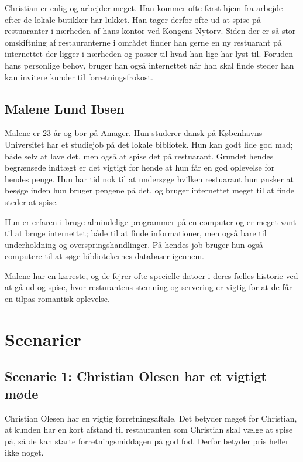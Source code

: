 \documentclass[a4paper, 12pt]{article}
\begin{document}
Christian er enlig og arbejder meget. Han kommer ofte først hjem fra arbejde
efter de lokale butikker har lukket. Han tager derfor ofte ud at spise på
restuaranter i nærheden af hans kontor ved Kongens Nytorv. Siden der er så stor
omskiftning af restauranterne i området finder han gerne en ny restuarant på
internettet der ligger i nærheden og passer til hvad han lige har lyst til.
Foruden hans personlige behov, bruger han også internettet når han skal finde
steder han kan invitere kunder til forretningsfrokost. 

\subsection{Malene Lund Ibsen}
Malene er 23 år og bor på Amager. Hun studerer dansk på Københavns Universitet
har et studiejob på det lokale bibliotek. Hun kan godt lide god mad; både selv
at lave det, men også at spise det på restuarant. Grundet hendes begrænsede
indtægt er det vigtigt for hende at hun får en god oplevelse for hendes penge.
Hun har tid nok til at undersøge hvilken restuarant hun ønsker at besøge inden
hun bruger pengene på det, og bruger internettet meget til at finde steder at
spise.

Hun er erfaren i bruge almindelige programmer på en computer og er meget vant
til at bruge internettet; både til at finde informationer, men også bare til
underholdning og overspringshandlinger. På hendes job bruger hun også computere
til at søge bibliotekernes databaser igennem. 

Malene har en kæreste, og de fejrer ofte specielle datoer i deres fælles
historie ved at gå ud og spise, hvor resturantens stemning og servering er
vigtig for at de får en tilpas romantisk oplevelse.

\section{Scenarier}
\label{sec:Scenarier}

\subsection{Scenarie 1: Christian Olesen har et vigtigt møde}
\label{sub:Scenarie 1: Christian Olesen}
Christian Olesen har en vigtig forretningsaftale. Det betyder meget for
Christian, at kunden har en kort afstand til restauranten som Christian skal
vælge at spise på, så de kan starte forretningsmiddagen på god fod. Derfor
betyder pris heller ikke noget.
\end{document}
